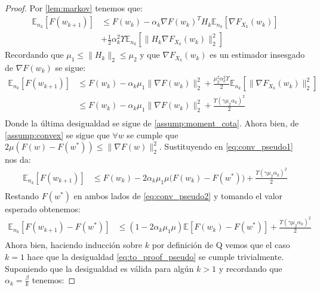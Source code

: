 \documentclass{book}
\theoremstyle{plain}
\theoremstyle{definition}
\theoremstyle{remark}
\begin{document}
\begin{proof}
Por \ref{lem:markov} tenemos que:
\begin{equation}
\begin{split}
       \mathbb{E}_{n_k}[F(w_{k+1})] & \leq F(w_{k}) -\alpha_k\nabla F(w_{k})^TH_k\mathbb{E}_{n_k}[\nabla F_{X_k}(w_k)]\\ & +\frac{1}{2}\alpha^2_k\Upsilon\mathbb{E}_{n_k}[\|H_k\nabla F_{X_k}(w_k)\|_2^2]
\end{split}
\end{equation}
Recordando que $\mu_{1}\leq\|H_k\|_2 \leq \mu_{2}$ y que $\nabla F_{X_k}(w_k)$ es un estimador insesgado de $\nabla F(w_k)$ se sigue:
\begin{equation}\label{eq:conv_pseudo1}
\begin{split}
       \mathbb{E}_{n_k}[F(w_{k+1})] & \leq F(w_{k}) -\alpha_k\mu_1\|\nabla F(w_{k})\|_2^2 +\frac{\mu_2^2\alpha^2_k\Upsilon}{2}\mathbb{E}_{n_k}[\|\nabla F_{X_k}(w_k)\|_2^2] \\
       & \leq F(w_{k}) -\alpha_k\mu_1\|\nabla F(w_{k})\|_2^2 +\frac{\Upsilon(\gamma\mu_2\alpha_k)^2}{2}\\
\end{split}
\end{equation}
Donde la última desigualdad se sigue de \ref{assump:moment_cota}. Ahora bien, de \ref{assump:convex} se sigue que $\forall w$ se cumple que $2\mu(F(w)-F(w^*))  \leq  \|\nabla F(w)\|_2^2$. Sustituyendo en \ref{eq:conv_pseudo1} nos da:
\begin{equation}\label{eq:conv_pseudo2}
\begin{split}
       \mathbb{E}_{n_k}[F(w_{k+1})]
       & \leq F(w_{k}) -2\alpha_k\mu_1\mu\bigg(F(w_{k})- F(w^*)\bigg) +\frac{\Upsilon(\gamma\mu_2\alpha_k)^2}{2}\\
\end{split}
\end{equation}
Restando $F(w^*)$ en ambos lados de \ref{eq:conv_pseudo2} y tomando el valor esperado obtenemos:
\begin{equation}\label{eq:conv_pseudo3}
\begin{split}
       \mathbb{E}_{n_k}[F(w_{k+1}) - F(w^*)]
       & \leq (1-2\alpha_k\mu_1\mu)\mathbb{E}[F(w_{k})- F(w^*)] +\frac{\Upsilon(\gamma\mu_2\alpha_k)^2}{2}\\
\end{split}
\end{equation}
Ahora bien, haciendo inducción sobre $k$ por definición de Q vemos que el caso $k=1$ hace que la desigualdad \ref{eq:to_proof_pseudo} se cumple trivialmente. Suponiendo que la desigualdad es válida para algún $k>1$ y recordando que $\alpha_k = \frac{\beta}{k}$ tenemos:

\end{proof}
\end{document}
